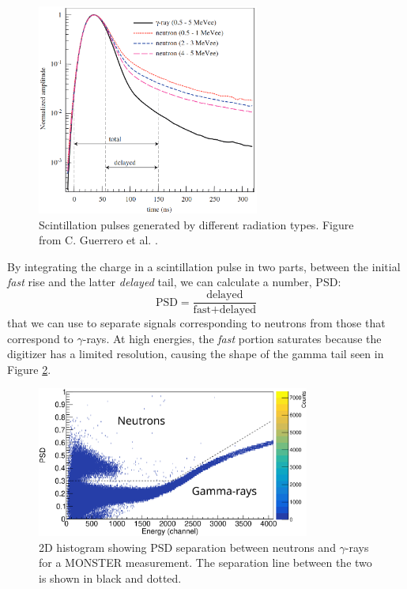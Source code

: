 \documentclass[a4paper,12pt]{report}
\begin{document}
\begin{figure}[H]
	\centering
	\includegraphics[width=0.65\textwidth]{psd_explanation.png}
	\caption{Scintillation pulses generated by different radiation types.
	Figure from C. Guerrero et al. \cite{guerrero2008}.}
	\label{psd_explanation}
\end{figure}

By integrating the charge in a scintillation pulse in two parts, between the initial \textit{fast} rise and the latter \textit{delayed} tail, we can calculate a number, PSD:
\begin{equation}
	\text{PSD} = \frac{\text{delayed}}{\text{fast}+\text{delayed}}
\end{equation}
that we can use to separate signals corresponding to neutrons from those that correspond to $\gamma$-rays.
At high energies, the \textit{fast} portion saturates because the digitizer has a limited resolution, causing the shape of the gamma tail seen in Figure \ref{example_psd}.

\begin{figure}[H]
	\centering
	\includegraphics[width=0.80\textwidth]{example_psd.eps}
	\caption{2D histogram showing PSD separation between neutrons and $\gamma$-rays for a MONSTER measurement.
	The separation line between the two is shown in black and dotted.}
	\label{example_psd}
\end{figure}
\end{document}
